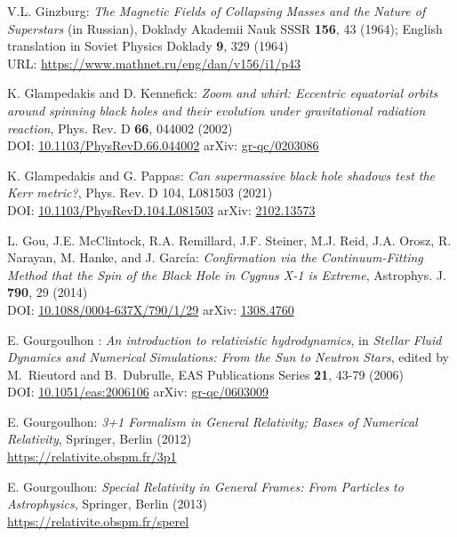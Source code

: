 \begin{thebibliography}{123}
V.L. Ginzburg:
{\em The Magnetic Fields of Collapsing Masses and the Nature of Superstars}
(in Russian),
Doklady Akademii Nauk SSSR {\bf 156}, 43 (1964); English translation in
Soviet Physics Doklady {\bf 9}, 329 (1964)\\
URL: \url{https://www.mathnet.ru/eng/dan/v156/i1/p43}

K. Glampedakis and D. Kennefick:
{\em Zoom and whirl: Eccentric equatorial orbits around spinning black holes and their evolution under gravitational radiation reaction},
Phys. Rev. D {\bf 66}, 044002 (2002)\\
DOI: \href{https://doi.org/10.1103/PhysRevD.66.044002}{10.1103/PhysRevD.66.044002}\hfill
arXiv: \href{https://arxiv.org/abs/gr-qc/0203086}{gr-qc/0203086}

K. Glampedakis and G. Pappas:
{\em Can supermassive black hole shadows test the Kerr metric?},
Phys. Rev. D 104, L081503 (2021)\\
DOI: \href{https://doi.org/10.1103/PhysRevD.104.L081503}{10.1103/PhysRevD.104.L081503}\hfill
arXiv: \href{https://arxiv.org/abs/2102.13573}{2102.13573}

L. Gou, J.E. McClintock, R.A. Remillard, J.F. Steiner, M.J. Reid, J.A. Orosz, R. Narayan, M. Hanke, and J. García:
{\em Confirmation via the Continuum-Fitting Method that the Spin of the Black Hole in Cygnus X-1 is Extreme},
Astrophys. J. {\bf 790}, 29 (2014)\\
DOI: \href{https://doi.org/10.1088/0004-637X/790/1/29}{10.1088/0004-637X/790/1/29}\hfill
arXiv: \href{https://arxiv.org/abs/1308.4760}{1308.4760}

E. Gourgoulhon :
{\em  An introduction to relativistic hydrodynamics},
in {\em Stellar Fluid Dynamics and Numerical Simulations: From the Sun
to Neutron Stars}, edited by M.~Rieutord and B.~Dubrulle,
EAS Publications Series {\bf 21}, 43-79 (2006) \\
DOI: \href{https://doi.org/10.1051/eas:2006106}{10.1051/eas:2006106}\hfill
arXiv: \href{https://arxiv.org/abs/gr-qc/0603009}{gr-qc/0603009}

E. Gourgoulhon:
{\em 3+1 Formalism in General Relativity; Bases of Numerical Relativity},
Springer, Berlin (2012)\\
\url{https://relativite.obspm.fr/3p1}

E. Gourgoulhon:
{\em Special Relativity in General Frames: From Particles to Astrophysics},
Springer, Berlin (2013) \\
\url{https://relativite.obspm.fr/sperel}


\end{thebibliography}
